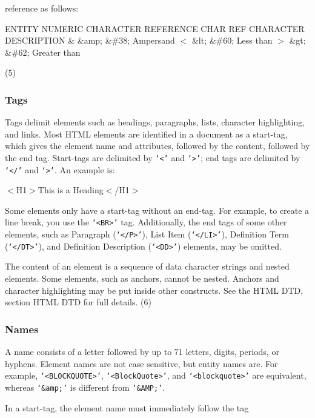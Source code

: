 reference as follows:
\par                  ENTITY      NUMERIC
       CHARACTER REFERENCE   CHAR REF     CHARACTER DESCRIPTION
         \&       \&amp;       \&\#38;        Ampersand 
         $<$       \&lt;        \&\#60;        Less than
         $>$       \&gt;        \&\#62;        Greater than
\par (5)\par \subsubsection*{Tags}\par 
Tags delimit elements such as headings, paragraphs, lists, character
highlighting, and links.  Most HTML elements are identified in a
document as a start-tag, which gives the element name and attributes,
followed by the content, followed by the end tag.  Start-tags are
delimited by {\tt `$<$'} and {\tt `$>$'};  end tags are delimited by
{\tt `$<$/'} and {\tt `$>$'}.  An example is:
\par $<$H1$>$This is a Heading$<$/H1$>$
\par 
Some elements only have a start-tag without an end-tag.  For example,
to create a line break, you use the {\tt `$<$BR$>$'} tag.  Additionally,
the end tags of some other elements, such as Paragraph
({\tt `$<$/P$>$'}), List Item ({\tt `$<$/LI$>$'}), Definition Term
({\tt `$<$/DT$>$'}), and Definition Description ({\tt `$<$DD$>$'})
elements, may be omitted.
\par \par 
The content of an element is a sequence of data character strings and nested 
elements.  Some elements, such as anchors, cannot be nested.  Anchors 
and character highlighting may be put inside other constructs.  See
the HTML DTD, section HTML DTD for full details.
(6)\par \subsubsection*{Names}\par 
A name consists of a letter followed by up to 71 letters, digits,
periods, or hyphens.  Element names are not case sensitive, but entity
names are.  For example, {\tt `$<$BLOCKQUOTE$>$'},
{\tt `$<$BlockQuote$>$'}, and {\tt `$<$blockquote$>$'} are equivalent,
whereas {\tt `\&amp;'} is different from {\tt `\&AMP;'}.
\par \par 
In a start-tag, the element name must immediately follow the tag 
